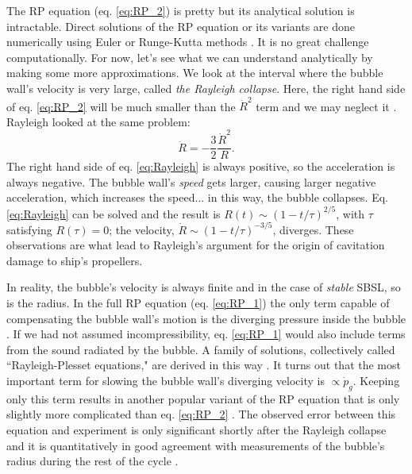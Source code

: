 \documentclass[11pt,prb,aps,nofootinbib,superscriptaddress,floatfix]{revtex4-2}
\begin{document}
The RP equation (eq. \ref{eq:RP_2}) is pretty but its analytical solution is intractable. Direct solutions of the RP equation or its variants are done numerically using Euler or Runge-Kutta methods \cite{yasui2018acoustic,yasui2015dynamics}. It is no great challenge computationally. For now, let's see what we can understand analytically by making some more approximations. We look at the interval where the bubble wall's velocity is very large, called \emph{the Rayleigh collapse}. Here, the right hand side of eq. \ref{eq:RP_2} will be much smaller than the $\dot{R}^2$ term and we may neglect it \cite{rayleigh1917pressure,plesset1949dynamics,prosperetti1999old,brenner2002single}. Rayleigh looked at the same problem:
\begin{equation}
    \ddot{R}=-\frac{3}{2} \frac{\dot{R}^2}{R}.
    \label{eq:Rayleigh}
\end{equation}
The right hand side of eq. \ref{eq:Rayleigh} is always positive, so the acceleration is always negative. The bubble wall's \emph{speed} gets larger, causing larger negative acceleration, which increases the speed... in this way, the bubble collapses. Eq. \ref{eq:Rayleigh} can be solved and the result is $R(t)\sim\left(1-t/\tau \right)^{2/5}$, with $\tau$ satisfying $R(\tau)=0$; the velocity, $\dot{R}\sim\left(1-t / \tau \right)^{-3/5}$, diverges. These observations are what lead to Rayleigh's argument for the origin of cavitation damage to ship's propellers. %

In reality, the bubble's velocity is always finite and in the case of \emph{stable} SBSL, so is the radius. In the full RP equation (eq. \ref{eq:RP_1}) the only term capable of compensating the bubble wall's motion is the diverging pressure inside the bubble \cite{brenner2002single}. If we had not assumed incompressibility, eq. \ref{eq:RP_1} would also include terms from the sound radiated by the bubble. A family of solutions, collectively called ``Rayleigh-Plesset equations," are derived in this way \cite{prosperetti1986bubble,prosperetti1988nonlinear,keller1956damping,lezzi1987bubble}. It turns out that the most important term for slowing the bubble wall's diverging velocity is $\propto\dot{p}_g$. Keeping only this term results in another popular variant of the RP equation that is only slightly more complicated than eq. \ref{eq:RP_2} \cite{lofstedt1995sonoluminescing,barber1997defining}. The observed error between this equation and experiment is only significant shortly after the Rayleigh collapse and it is quantitatively in good agreement with measurements of the bubble's radius during the rest of the cycle \cite{brenner2002single}. 
\end{document}
